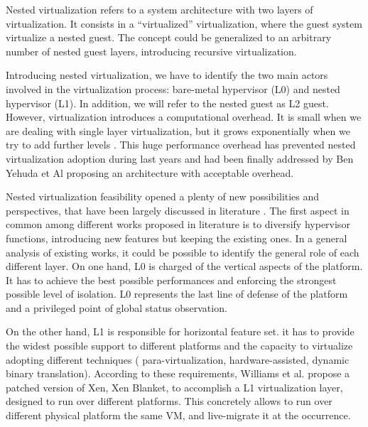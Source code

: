 \documentclass{acm_proc_article-sp} %
\begin{document}
Nested virtualization refers to a system architecture with two layers of virtualization. It consists in a ``virtualized'' virtualization, where the guest system virtualize a nested guest. The concept could be generalized to an arbitrary number of nested guest layers, introducing recursive virtualization.

Introducing nested virtualization, we have to identify the two main actors involved in the virtualization process: bare-metal hypervisor (L0) and nested hypervisor (L1). In addition, we will refer to the nested guest as L2 guest. 
However, virtualization introduces a computational overhead. It is small when we are dealing with single layer virtualization, but it grows exponentially when we try to add further levels \cite{rec:virt}. This huge performance overhead has prevented nested virtualization adoption during last years and had been finally addressed by Ben Yehuda et Al \cite{turtles:ibm} proposing an architecture with acceptable overhead.

Nested virtualization feasibility opened a plenty of new possibilities and perspectives, that have been largely discussed in literature \cite{rec:virt,turtles:ibm,art:blan}. The first aspect in common among different works proposed in literature is to diversify hypervisor functions, introducing new features but keeping the existing ones. In a general analysis of existing works, it could be possible to identify the general role of each different layer.
On one hand, L0 is charged of the vertical aspects of the platform. It has to achieve  the best possible performances and enforcing the strongest possible level of isolation. L0 represents the last line of defense of the platform and a privileged point of global status observation.

On the other hand, L1 is responsible for horizontal feature set. it has to provide the widest possible support to different platforms and the capacity to virtualize adopting different techniques ( para-virtualization, hardware-assisted, dynamic binary translation). According to these requirements, Williams et al. \cite{art:blan} propose a patched version of Xen, Xen Blanket, to accomplish a L1 virtualization layer, designed to run over different platforms. This concretely allows to run over different physical platform the same VM, and live-migrate it at the occurrence.
\end{document}
